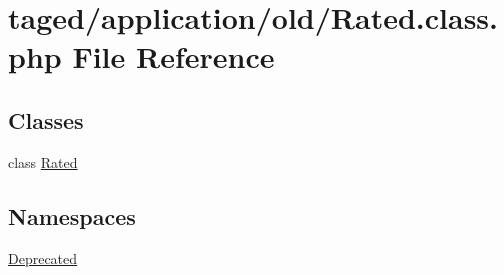 \hypertarget{_rated_8class_8php}{}\section{taged/application/old/\+Rated.class.\+php File Reference}
\label{_rated_8class_8php}
\subsection*{Classes}
\begin{DoxyCompactItemize}
\item 
class \hyperlink{class_rated}{Rated}
\end{DoxyCompactItemize}
\subsection*{Namespaces}
\begin{DoxyCompactItemize}
\item 
 \hyperlink{namespace_deprecated}{Deprecated}
\end{DoxyCompactItemize}

